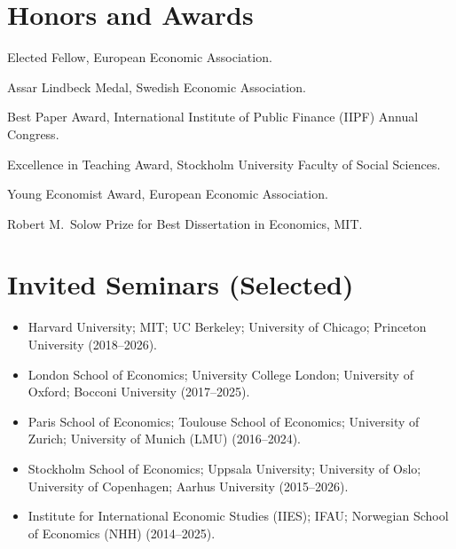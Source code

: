 \documentclass[11pt]{article}
\newcommand{\NEW}[1]{\textcolor{newgreen}{#1}}%
\newcommand{\NEW}[1]{#1}%
\newcommand{\dated}[2]{%
  \noindent\makebox[5.2em][l]{\textcolor{mutedgray}{#1}}%
  \begin{minipage}[t]{\dimexpr\linewidth-5.4em\relax}#2\end{minipage}\par\vspace{3pt}}
\begin{document}
\section{Honors and Awards}
\dated{\NEW{2026}}{\NEW{Elected Fellow, European Economic Association.}}
\dated{2025}{Assar Lindbeck Medal, Swedish Economic Association.}
\dated{2024}{Best Paper Award, International Institute of Public Finance (IIPF) Annual Congress.}
\dated{2023}{Excellence in Teaching Award, Stockholm University Faculty of Social Sciences.}
\dated{2019}{Young Economist Award, European Economic Association.}
\dated{2011}{Robert M.\ Solow Prize for Best Dissertation in Economics, MIT.}

\section{Invited Seminars (Selected)}
\begin{itemize}
\item Harvard University; MIT; UC Berkeley; University of Chicago; Princeton University (2018--2026).
\item London School of Economics; University College London; University of Oxford; Bocconi University (2017--2025).
\item Paris School of Economics; Toulouse School of Economics; University of Zurich; University of Munich (LMU) (2016--2024).
\item Stockholm School of Economics; Uppsala University; University of Oslo; University of Copenhagen; Aarhus University (2015--2026).
\item Institute for International Economic Studies (IIES); IFAU; Norwegian School of Economics (NHH) (2014--2025).
\end{itemize}

\end{document}
